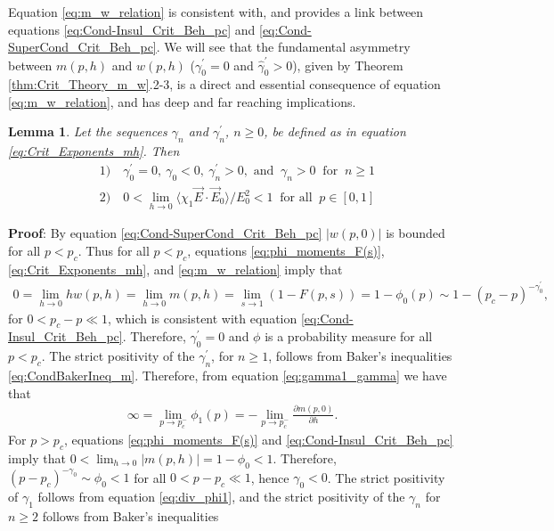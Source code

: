 \documentclass[jmp,graphicx]{revtex4-1}
\newtheorem{lemma}{Lemma}[section]
\newcommand{\gh}{\hat{\gamma}}
\begin{document}
Equation \eqref{eq:m_w_relation} is consistent with, and provides a
link between equations \eqref{eq:Cond-Insul_Crit_Beh_pc} and
\eqref{eq:Cond-SuperCond_Crit_Beh_pc}. We will see that the
fundamental asymmetry  between $m(p,h)$ and $w(p,h)$ ($\gamma_0^\prime=0$ and
$\gh_0^\prime>0$), given by Theorem \ref{thm:Crit_Theory_m_w}.2-3, is a
direct and essential consequence of equation \eqref{eq:m_w_relation},
and has deep and far reaching implications.      
%
\begin{lemma}\label{lem:zero_gamma0}
  Let the sequences $\gamma_n$ and $\gamma_n^\prime$, $n\geq0$, be defined as in
  equation \eqref{eq:Crit_Exponents_mh}. Then
  \begin{align*}
    &1) \quad \gamma_0^\prime=0, \ \gamma_0<0, \ \gamma_n^\prime>0,   \text{ and } \ \gamma_n>0 \
        \text{ for } \ n\geq1 \\
    &2) \quad 0<\lim_{h\to0}\langle\chi_1\vec{E}\cdot\vec{E}_0\rangle/E_0^2<1 \
         \text{ for all } \ p\in[0,1]
  \end{align*}
\end{lemma}
%
\noindent \textbf{Proof}:
%
By equation \eqref{eq:Cond-SuperCond_Crit_Beh_pc} $|w(p,0)|$ is  
bounded for all $p<p_c$. Thus for all $p<p_c$, equations
\eqref{eq:phi_moments_F(s)}, \eqref{eq:Crit_Exponents_mh}, 
and \eqref{eq:m_w_relation} imply that
%
\begin{align*}
  0=\lim_{h\to0}hw(p,h)=\lim_{h\to0}m(p,h)=\lim_{s\to1}(1-F(p,s))=1-\phi_0(p)\sim1-(p_c-p)^{-\gamma_0^\prime},
\end{align*}
%
for $0<p_c-p\ll1$, which is consistent with equation
\eqref{eq:Cond-Insul_Crit_Beh_pc}. Therefore, $\gamma_0^\prime=0$ and $\phi$ is a
probability measure for all $p<p_c$. The strict positivity of the
$\gamma_n^\prime$, for $n\geq1$, follows from Baker's inequalities
\eqref{eq:CondBakerIneq_m}. Therefore, from equation
\eqref{eq:gamma1_gamma} we have that
%
\begin{align}\label{eq:div_phi1}
  \infty=\lim_{p\to p_c^-}\phi_1(p)=-\lim_{p\to p_c^-}\frac{\partial m(p,0)}{\partial h}.
\end{align}
%
For $p>p_c$, equations \eqref{eq:phi_moments_F(s)} and
\eqref{eq:Cond-Insul_Crit_Beh_pc} imply that
$0<\lim_{h\to0}|m(p,h)|=1-\phi_0<1$. Therefore, $(p-p_c)^{-\gamma_0}\sim\phi_0<1$ for
all $0<p-p_c\ll1$, hence $\gamma_0<0$. The strict positivity of $\gamma_1$ follows
from equation \eqref{eq:div_phi1}, and the strict positivity of the
$\gamma_n$ for $n\geq2$ follows from Baker's inequalities
\end{document}
